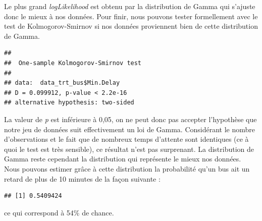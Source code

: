 \documentclass[
  11pt,
  french,
]{book}
\makeatletter
\newenvironment{Shaded}{\begin{snugshade}}{\end{snugshade}}
\newcommand{\DataTypeTok}[1]{\textcolor[rgb]{0.13,0.29,0.53}{#1}}
\newcommand{\DecValTok}[1]{\textcolor[rgb]{0.00,0.00,0.81}{#1}}
\newcommand{\KeywordTok}[1]{\textcolor[rgb]{0.13,0.29,0.53}{\textbf{#1}}}
\newcommand{\NormalTok}[1]{#1}
\newcommand{\OperatorTok}[1]{\textcolor[rgb]{0.81,0.36,0.00}{\textbf{#1}}}
\newcommand{\StringTok}[1]{\textcolor[rgb]{0.31,0.60,0.02}{#1}}
\newenvironment{kframe}{%
\medskip{}
\setlength{\fboxsep}{.8em}
 \def\at@end@of@kframe{}%
 \ifinner\ifhmode%
  \def\at@end@of@kframe{\end{minipage}}%
  \begin{minipage}{\columnwidth}%
 \fi\fi%
 \def\FrameCommand##1{\hskip\@totalleftmargin \hskip-\fboxsep
 \colorbox{shadecolor}{##1}\hskip-\fboxsep
     \hskip-\linewidth \hskip-\@totalleftmargin \hskip\columnwidth}%
 \MakeFramed {\advance\hsize-\width
   \@totalleftmargin\z@ \linewidth\hsize
   \@setminipage}}%
 {\par\unskip\endMakeFramed%
 \at@end@of@kframe}
\renewenvironment{Shaded}{\begin{kframe}}{\end{kframe}}
\makeatother
\begin{document}
Le plus grand \emph{logLikelihood} est obtenu par la distribution de Gamma qui s'ajuste donc le mieux à nos données. Pour finir, nous pouvons tester formellement avec le test de Kolmogorov-Smirnov si nos données proviennent bien de cette distribution de Gamma.

\begin{Shaded}
\end{Shaded}

\begin{verbatim}
## 
##  One-sample Kolmogorov-Smirnov test
## 
## data:  data_trt_bus$Min.Delay
## D = 0.099912, p-value < 2.2e-16
## alternative hypothesis: two-sided
\end{verbatim}

La valeur de \emph{p} est inférieure à 0,05, on ne peut donc pas accepter l'hypothèse que notre jeu de données suit effectivement un loi de Gamma. Considérant le nombre d'observations et le fait que de nombreux temps d'attente sont identiques (ce à quoi le test est très sensible), ce résultat n'est pas surprenant. La distribution de Gamma reste cependant la distribution qui représente le mieux nos données. Nous pouvons estimer grâce à cette distribution la probabilité qu'un bus ait un retard de plus de 10 minutes de la façon suivante :

\begin{Shaded}
\end{Shaded}

\begin{verbatim}
## [1] 0.5409424
\end{verbatim}

ce qui correspond à 54\% de chance.
\end{document}
